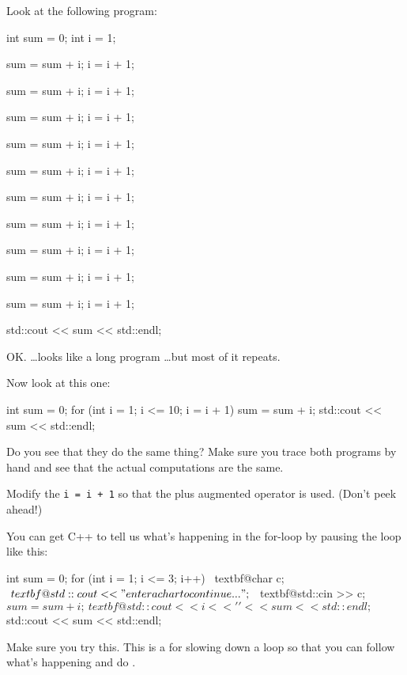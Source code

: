 \newpage{}

Look at the following program:
\begin{console}
int sum = 0;
int i = 1;

sum = sum + i;
i = i + 1;

sum = sum + i;
i = i + 1;

sum = sum + i;
i = i + 1;

sum = sum + i;
i = i + 1;

sum = sum + i;
i = i + 1;

sum = sum + i;
i = i + 1;

sum = sum + i;
i = i + 1;

sum = sum + i;
i = i + 1;

sum = sum + i;
i = i + 1;

sum = sum + i;
i = i + 1;

std::cout << sum << std::endl;
\end{console}

OK. \ldots looks like a long program \ldots but most of it repeats.

Now look at this one:
\begin{console}
int sum = 0;
for (int i = 1; i <= 10; i = i + 1)
{   
    sum = sum + i;
}
std::cout << sum << std::endl;
\end{console}

Do you see that they do the same thing? Make sure you trace both
programs by hand and see that the actual computations are the same.

\begin{ex}
Modify the \texttt{i = i + 1} so that the plus
augmented operator is used. (Don't peek ahead!)
\end{ex}
\begin{ex}
You can get C++ to tell us what's
happening in the for-loop by pausing the loop like this:
\begin{console}[commandchars=\~\@\$]
int sum = 0;
for (int i = 1; i <= 3; i++)
{   
     ~textbf@char c;$
     ~textbf@std::cout << "enter a char to continue ...";$
     ~textbf@std::cin >> c;$

     sum = sum + i;
     ~textbf@std::cout << i << ' ' << sum << std::endl;$
}
std::cout << sum << std::endl;
\end{console}
\end{ex}

Make sure you try this. This is a  for
slowing down a loop so that you can follow what's
happening and do .

